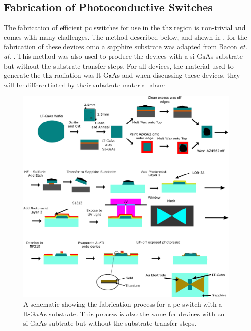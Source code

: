 \subsection{Fabrication of Photoconductive Switches}
The fabrication of efficient \acrshort{pc} switches for use in the \acrshort{thz} region is non\nobreakdash-trivial and comes with many challenges. The method described below, and shown in , for the fabrication of these devices onto a sapphire substrate was adapted from Bacon \textit{et. al.} \cite{Bacon2016}. This method was also used to produce the devices with a \acrshort{si}\nobreakdash-GaAs substrate but without the substrate transfer steps. For all devices, the material used to generate the \acrshort{thz} radiation was \acrshort{lt}\nobreakdash-GaAs and when discussing these devices, they will be differentiated by their substrate material alone.

\begin{figure}[t]
    \centering
    \includegraphics[scale=0.49]{Figures/Misc/SysDev/Fabrication_V2.png}
    \captionsetup{font = footnotesize, justification = centering}
    \caption[A Schematic showing the Fabrication Process for a Photoconductive Switch with a LT-GaAs Substrate]{A schematic showing the fabrication process for a \acrshort{pc} switch with a \acrshort{lt}\nobreakdash-GaAs substrate. This process is also the same for devices with an \acrshort{si}\nobreakdash-GaAs subtrate but without the substrate transfer steps.}
    \label{fig:fabrication}
\end{figure}

